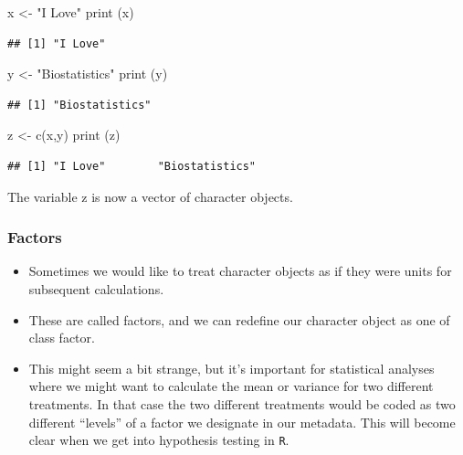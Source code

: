 \documentclass[
]{book}
\newenvironment{Shaded}{\begin{snugshade}}{\end{snugshade}}
\newcommand{\FunctionTok}[1]{\textcolor[rgb]{0.00,0.00,0.00}{#1}}
\newcommand{\NormalTok}[1]{#1}
\newcommand{\OtherTok}[1]{\textcolor[rgb]{0.56,0.35,0.01}{#1}}
\newcommand{\StringTok}[1]{\textcolor[rgb]{0.31,0.60,0.02}{#1}}
\begin{document}
\begin{Shaded}
\begin{Highlighting}[]
\NormalTok{x }\OtherTok{\textless{}{-}} \StringTok{"I Love"}
\FunctionTok{print}\NormalTok{ (x)}
\end{Highlighting}
\end{Shaded}

\begin{verbatim}
## [1] "I Love"
\end{verbatim}

\begin{Shaded}
\begin{Highlighting}[]
\NormalTok{y }\OtherTok{\textless{}{-}} \StringTok{"Biostatistics"}
\FunctionTok{print}\NormalTok{ (y)}
\end{Highlighting}
\end{Shaded}

\begin{verbatim}
## [1] "Biostatistics"
\end{verbatim}

\begin{Shaded}
\begin{Highlighting}[]
\NormalTok{z }\OtherTok{\textless{}{-}} \FunctionTok{c}\NormalTok{(x,y)}
\FunctionTok{print}\NormalTok{ (z)}
\end{Highlighting}
\end{Shaded}

\begin{verbatim}
## [1] "I Love"        "Biostatistics"
\end{verbatim}

The variable z is now a vector of character objects.

\hypertarget{factors}{%
\subsubsection{Factors}\label{factors}}

\begin{itemize}
\item
  Sometimes we would like to treat character objects as if they were units for subsequent calculations.
\item
  These are called factors, and we can redefine our character object as one of class factor.
\item
  This might seem a bit strange, but it's important for statistical analyses where we might want to calculate the mean or variance for two different treatments. In that case the two different treatments would be coded as two different ``levels'' of a factor we designate in our metadata. This will become clear when we get into hypothesis testing in \texttt{R}.
\end{itemize}
\end{document}
